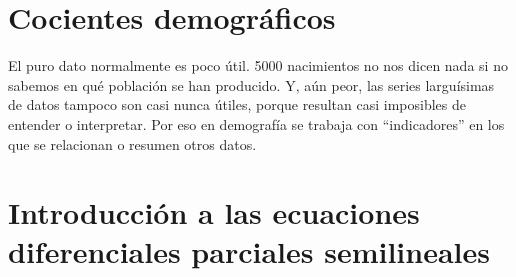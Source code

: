 \documentclass[a4paper,11pt]{book}
\begin{document}
\chapter{Cocientes demográficos}
    El puro dato normalmente es poco útil. 5000 nacimientos no nos dicen nada si no sabemos en qué población se han producido. Y, aún peor, las series larguísimas de datos tampoco son casi nunca útiles, porque resultan casi imposibles de entender o interpretar. Por eso en demografía se trabaja con “indicadores” en los que se relacionan o resumen otros datos.
    
    

\chapter{Introducción a las ecuaciones diferenciales parciales semilineales}

    
    
    
    
\end{document}
